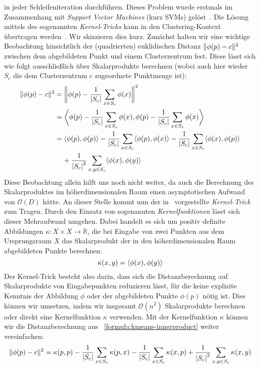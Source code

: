 in jeder Schleifeniteration durchführen.
\absatz
Dieses Problem wurde erstmals im Zusammenhang mit \emph{Support Vector Machines} (kurz SVMs) gelöst~\cite{BoserGV92}.
Die Lösung mittels des sogenannten \emph{Kernel-Tricks} kann in den Clustering-Kontext übertragen werden~\cite{Schmidt14}.
Wir skizzieren dies kurz.
Zunächst halten wir eine wichtige Beobachtung hinsichtlich der (quadrierten) euklidischen Distanz $\lVert {\phi(p)} - {c} \rVert^2$
zwischen dem abgebildeten Punkt und einem Clusterzentrum fest. Diese lässt sich wie folgt ausschließlich über Skalarprodukte
berechnen (wobei auch hier wieder $S_c$ die dem Clusterzentrum $c$ zugeordnete Punktmenge ist):
\begin{align}
\label{formula:kmeans-innerproduct}
	\lVert {\phi(p)} - {c} \rVert^2 &= \bigg\lVert \phi(p) - \frac{1}{\left|S_c\right|} \sum_{x \in S_c} \phi(x) \bigg\rVert^2 \notag \\
	&= \bigg\langle \phi(p) - \frac{1}{\left|S_c\right|} \sum_{x \in S_c} \phi(x),
		\phi(p) - \frac{1}{\left|S_c\right|} \sum_{x \in S_c} \phi(x) \bigg\rangle \notag \\
	&= \langle \phi(p), \phi(p) \rangle - \frac{1}{\left|S_c\right|} \sum_{x \in S_c} \langle \phi(p), \phi(x) \rangle
		- \frac{1}{\left|S_c\right|} \sum_{x \in S_c} \langle \phi(x), \phi(p) \rangle \notag \\
		& \hspace{0.4cm} + \frac{1}{\left|S_c\right|^2} \sum_{x,y \in S_c} \langle \phi(x), \phi(y) \rangle
\end{align}
Diese Beobachtung allein hilft uns noch nicht weiter, da auch die Berechnung des Skalarproduktes im höherdimensionalen
Raum einen asymptotischen Aufwand von $\mathcal{O}(D)$ hätte. An dieser Stelle kommt nun der in~\cite{BoserGV92} vorgestellte
\emph{Kernel-Trick} zum Tragen. Durch den Einsatz von sogenannten \emph{Kernelfunktionen} lässt sich dieser Mehraufwand
umgehen. Dabei handelt es sich um positiv definite Abbildungen $\kappa : X \times X \rightarrow \mathbb{R}$, die bei Eingabe von
zwei Punkten aus dem Ursprungsraum $X$ das Skalarprodukt der in den höherdimensionalen Raum abgebildeten Punkte berechnen:
\[ \kappa(x,y) = \langle \phi(x), \phi(y) \rangle \]
Der Kernel-Trick besteht also darin, dass sich die Distanzberechnung auf Skalarprodukte von Eingabepunkten reduzieren lässt, für
die keine explizite Kenntnis der Abbildung $\phi$ oder der abgebildeten Punkte $\phi(p)$ nötig ist. Dies können wir umsetzen,
indem wir insgesamt $\mathcal{O}(n^2)$ Skalarprodukte berechnen oder direkt eine Kernelfunktion $\kappa$ verwenden.
Mit der Kernelfunktion $\kappa$ können wir die Distanzberechnung aus ~\ref{formula:kmeans-innerproduct} weiter vereinfachen:
\begin{align}
\label{formula:kernel-kmeans}
	\lVert {\phi(p)} - {c} \rVert^2 = \kappa(p,p) - \frac{1}{\left|S_c\right|} \sum_{x \in S_c} \kappa(p, x)
		- \frac{1}{\left|S_c\right|} \sum_{x \in S_c} \kappa(x, p)
		+ \frac{1}{\left|S_c\right|^2} \sum_{x,y \in S_c} \kappa(x, y)
\end{align}

